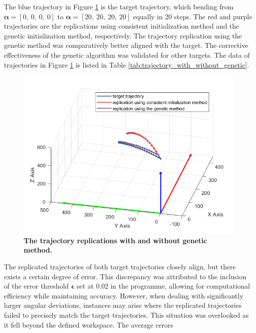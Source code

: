 The blue trajectory in Figure \ref{fig:genetic_approach} is the target trajectory, which bending from 
$\boldsymbol{\alpha} = [0,\ 0,\ 0,\ 0]$ to $\boldsymbol{\alpha} = [20,\ 20,\ 20,\ 20]$ equally in 20 steps. 
The red and purple trajectories are the replications using consistent initialization method and the genetic 
initialization method, respectively. The trajectory replication using the genetic method was comparatively better 
aligned with the target. The corrective effectiveness of the genetic algorithm was validated for 
other targets. The data of trajectories in Figure \ref{fig:genetic_approach} is listed in Table 
\ref{tab:trajectory_with_without_genetic}.
\begin{figure}[H] %
    \centering 
    \captionsetup{labelsep=colon}
    \includegraphics[width=1.0\textwidth]{Image/Result/trajectory_replication_diff_initialization.png} 
    \caption[The trajectory replications with and without genetic method]
    {\centering \textbf{The trajectory replications with and without genetic method.}}
    \label{fig:genetic_approach}
\end{figure}
\vspace{-5mm}
The replicated trajectories of both target trajectories closely align, but there exists a certain degree of error. 
This discrepancy was attributed to the inclusion of the error threshold $\boldsymbol{\epsilon}$ set at 0.02 in the 
programme, allowing for computational efficiency while maintaining accuracy. However, when dealing with significantly 
larger angular deviations, instances may arise where the replicated trajectories failed to precisely match the 
target trajectories. This situation was overlooked as it fell beyond the defined workspace. The average errors
